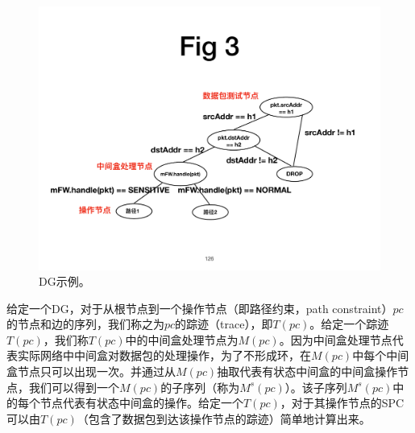 
\begin{figure}[!htbp]
\centering
      \centering\includegraphics[width=\linewidth]{figures/ss-126.pdf}
\caption{DG示例。}
\label{fig:dg-example}
\end{figure}

给定一个DG，对于从根节点到一个操作节点（即路径约束，path constraint）$pc$的节点和边的序列，我们称之为$pc$的踪迹（trace），即$T(pc)$。给定一个踪迹$T(pc)$，我们称$T(pc)$中的中间盒处理节点为$M(pc)$。因为中间盒处理节点代表实际网络中中间盒对数据包的处理操作，为了不形成环，在$M(pc)$中每个中间盒节点只可以出现一次。并通过从$M(pc)$抽取代表有状态中间盒的中间盒操作节点，我们可以得到一个$M(pc)$的子序列（称为$M^s(pc)$）。该子序列$M^s(pc)$中的每个节点代表有状态中间盒的操作。给定一个$T(pc)$，对于其操作节点的SPC可以由$T(pc)$（包含了数据包到达该操作节点的踪迹）简单地计算出来。

